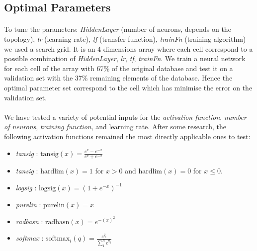 \documentclass[a4paper,12pt,oneside,final]{report}
\begin{document}
\subsection{Optimal Parameters}
\label{ch:opset}
\paragraph{}
To tune the parameters: \textit{HiddenLayer} (number of neurons, depends on the topology), \textit{lr} (learning rate), \textit{tf} (transfer function), \textit{trainFn} (training algorithm) we used a search grid. It is an 4 dimensions array where each cell correspond to a possible combination of \textit{HiddenLayer}, \textit{lr}, \textit{tf}, \textit{trainFn}. We train a neural network for each cell of the array with 67\% of the original database and test it on a validation set with the 37\% remaining elements of the database. Hence the optimal parameter set correspond to the cell which has minimise the error on the validation set.
\paragraph{}
We have tested a variety of potential inputs for the \textit{activation function}, \textit{number of neurons}, \textit{training function}, and learning rate.  After some research, the following activation functions remained the most directly applicable ones to test:
\begin{itemize}
\item \textit{tansig} : $\text{tansig}(x) = \frac{e^x - e^{-x}}{e^x + e^{-x}}$
\item \textit{tansig} : $\text{hardlim}(x) = 1$ for $x>0$ and $\text{hardlim}(x) = 0$ for $x \leq 0$.
\item \textit{logsig} : $\text{logsig}(x) = (1 + e^{-x})^{-1}$
\item\textit{purelin} : $\text{purelin}(x) = x$
\item \textit{radbasn} : $\text{radbasn}(x) = e^{-(x)^2}$
\item \textit{softmax} : $\text{softmax}_i(q) = \frac{e^{q_i}}{\sum_1^n e^{q_j}}$
\end{itemize}
\end{document}
